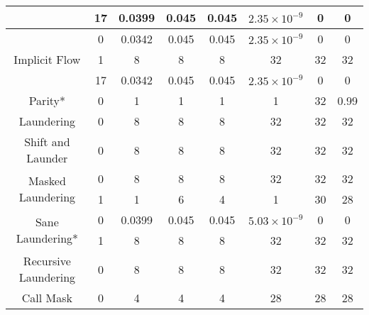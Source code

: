 \begin{table}[]
{\begin{tabular}{cc|ccc|ccc}
                                   & 17      & 0.0399         & 0.045       & 0.045       & $2.35 \times 10^{-9}$                                            & 0        & 0        \\\hline
\multirow{3}{*}{Implicit Flow}     & 0       & 0.0342         & 0.045       & 0.045       & $2.35 \times 10^{-9}$                                            & 0        & 0        \\
                                   & 1       & 8              & 8           & 8           & 32                                          & 32       & 32       \\
                                   & 17      & 0.0342         & 0.045       & 0.045       & $2.35 \times 10^{-9}$                                            & 0        & 0        \\\hline\hline
Parity*                            & 0       & 1              & 1           & 1           & 1                                           & 32       & 0.99     \\\hline
Laundering                         & 0       & 8              & 8           & 8           & 32                                          & 32       & 32       \\\hline
Shift and Launder                  & 0       & 8              & 8           & 8           & 32                                          & 32       & 32       \\\hline
\multirow{2}{*}{Masked Laundering} & 0       & 8              & 8           & 8           & 32                                          & 32       & 32       \\
                                   & 1       & 1              & 6           & 4           & 1                                           & 30       & 28       \\\hline
\multirow{2}{*}{Sane Laundering*}  & 0       & 0.0399         & 0.045       & 0.045       & $5.03 \times 10^{-9}$                                        & 0        & 0        \\
                                   & 1       & 8              & 8           & 8           & 32                                          & 32       & 32       \\\hline\hline
Recursive Laundering               & 0       & 8              & 8           & 8           & 32                                          & 32       & 32       \\\hline
Call Mask                          & 0       & 4              & 4           & 4           & 28                                          & 28       & 28       \\\hline

\end{tabular}}
\end{table}
